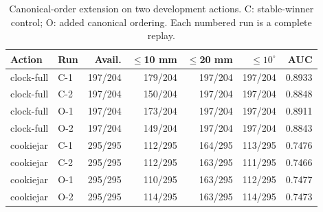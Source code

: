 \begin{table}[t]\centering\scriptsize
\caption{Canonical-order extension on two development actions. C: stable-winner control; O: added canonical ordering. Each numbered run is a complete replay.}
\label{tab:bt-order-cross}
\begin{tabular}{llrrrrr}\toprule
Action & Run & Avail. & $\leq$10 mm & $\leq$20 mm & $\leq10^\circ$ & AUC\\\midrule
clock-full & C-1 & 197/204 & 179/204 & 197/204 & 197/204 & 0.8933\\
clock-full & C-2 & 197/204 & 150/204 & 197/204 & 197/204 & 0.8848\\
clock-full & O-1 & 197/204 & 173/204 & 197/204 & 197/204 & 0.8911\\
clock-full & O-2 & 197/204 & 149/204 & 197/204 & 197/204 & 0.8843\\
cookiejar & C-1 & 295/295 & 112/295 & 164/295 & 113/295 & 0.7476\\
cookiejar & C-2 & 295/295 & 112/295 & 163/295 & 111/295 & 0.7466\\
cookiejar & O-1 & 295/295 & 110/295 & 163/295 & 112/295 & 0.7477\\
cookiejar & O-2 & 295/295 & 114/295 & 163/295 & 114/295 & 0.7473\\
\bottomrule\end{tabular}\end{table}
